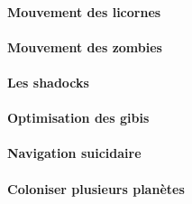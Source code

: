 \documentclass{report}
\begin{document}
			\paragraph{Mouvement des licornes}
			\paragraph{Mouvement des zombies}
			\paragraph{Les shadocks}
			\paragraph{Optimisation des gibis}
			\paragraph{Navigation suicidaire}
			\paragraph{Coloniser plusieurs planètes}
	\setcounter{tocdepth}{4}
	\tableofcontents
\end{document}
